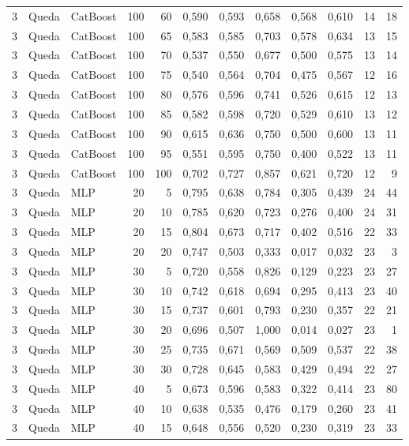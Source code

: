 \begin{longtable}{@{}rllrrrrrrrrr@{}}
3 & Queda & CatBoost & 100 & 60 & 0,590 & 0,593 & 0,658 & 0,568 & 0,610 & 14 & 18 \\
3 & Queda & CatBoost & 100 & 65 & 0,583 & 0,585 & 0,703 & 0,578 & 0,634 & 13 & 15 \\
3 & Queda & CatBoost & 100 & 70 & 0,537 & 0,550 & 0,677 & 0,500 & 0,575 & 13 & 14 \\
3 & Queda & CatBoost & 100 & 75 & 0,540 & 0,564 & 0,704 & 0,475 & 0,567 & 12 & 16 \\
3 & Queda & CatBoost & 100 & 80 & 0,576 & 0,596 & 0,741 & 0,526 & 0,615 & 12 & 13 \\
3 & Queda & CatBoost & 100 & 85 & 0,582 & 0,598 & 0,720 & 0,529 & 0,610 & 13 & 12 \\
3 & Queda & CatBoost & 100 & 90 & 0,615 & 0,636 & 0,750 & 0,500 & 0,600 & 13 & 11 \\
3 & Queda & CatBoost & 100 & 95 & 0,551 & 0,595 & 0,750 & 0,400 & 0,522 & 13 & 11 \\
3 & Queda & CatBoost & 100 & 100 & 0,702 & 0,727 & 0,857 & 0,621 & 0,720 & 12 & 9 \\
3 & Queda & MLP & 20 & 5 & 0,795 & 0,638 & 0,784 & 0,305 & 0,439 & 24 & 44 \\
3 & Queda & MLP & 20 & 10 & 0,785 & 0,620 & 0,723 & 0,276 & 0,400 & 24 & 31 \\
3 & Queda & MLP & 20 & 15 & 0,804 & 0,673 & 0,717 & 0,402 & 0,516 & 22 & 33 \\
3 & Queda & MLP & 20 & 20 & 0,747 & 0,503 & 0,333 & 0,017 & 0,032 & 23 & 3 \\
3 & Queda & MLP & 30 & 5 & 0,720 & 0,558 & 0,826 & 0,129 & 0,223 & 23 & 27 \\
3 & Queda & MLP & 30 & 10 & 0,742 & 0,618 & 0,694 & 0,295 & 0,413 & 23 & 40 \\
3 & Queda & MLP & 30 & 15 & 0,737 & 0,601 & 0,793 & 0,230 & 0,357 & 22 & 21 \\
3 & Queda & MLP & 30 & 20 & 0,696 & 0,507 & 1,000 & 0,014 & 0,027 & 23 & 1 \\
3 & Queda & MLP & 30 & 25 & 0,735 & 0,671 & 0,569 & 0,509 & 0,537 & 22 & 38 \\
3 & Queda & MLP & 30 & 30 & 0,728 & 0,645 & 0,583 & 0,429 & 0,494 & 22 & 27 \\
3 & Queda & MLP & 40 & 5 & 0,673 & 0,596 & 0,583 & 0,322 & 0,414 & 23 & 80 \\
3 & Queda & MLP & 40 & 10 & 0,638 & 0,535 & 0,476 & 0,179 & 0,260 & 23 & 41 \\
3 & Queda & MLP & 40 & 15 & 0,648 & 0,556 & 0,520 & 0,230 & 0,319 & 23 & 33 \\

\end{longtable}
